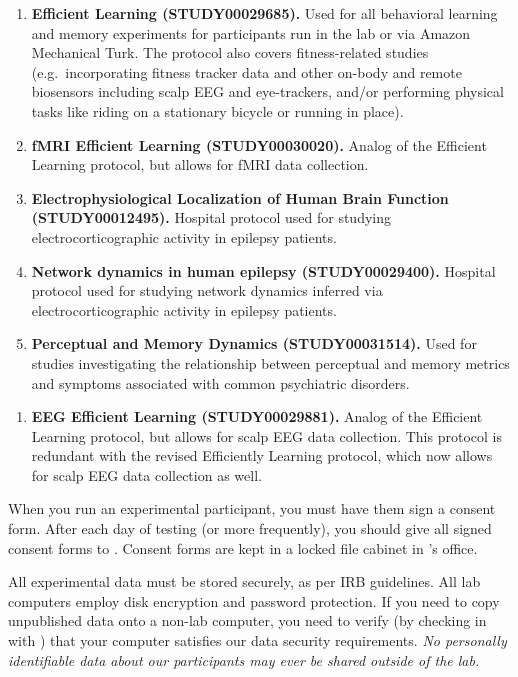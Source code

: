 \documentclass{tufte-book} %
\begin{document}

 \begin{enumerate}
 \item \textbf{Efficient Learning (STUDY00029685).}  Used for all
   behavioral learning and memory experiments for participants run in
   the lab or via Amazon Mechanical Turk.  The protocol also covers
   fitness-related studies (e.g.\ incorporating fitness tracker data
   and other on-body and remote biosensors including scalp EEG and
   eye-trackers, and/or performing physical tasks like riding on a
   stationary bicycle or running in place).
    \item \textbf{fMRI Efficient Learning (STUDY00030020).}  Analog of
      the Efficient Learning protocol, but allows for fMRI data
      collection.
    \item \textbf{Electrophysiological Localization of Human Brain
        Function (STUDY00012495).}  Hospital protocol used for
      studying electrocorticographic activity in epilepsy patients.
    \item \textbf{Network dynamics in human epilepsy (STUDY00029400).}
      Hospital protocol used for studying network dynamics inferred
      via electrocorticographic activity in epilepsy patients.
    \item \textbf{Perceptual and Memory Dynamics (STUDY00031514).}
    Used for studies investigating the relationship between perceptual and
    memory metrics and symptoms associated with common psychiatric disorders.

   \end{enumerate}

 \begin{enumerate}
   \item \textbf{EEG Efficient Learning (STUDY00029881).} Analog of
     the Efficient Learning protocol, but allows for scalp EEG data
     collection.  This protocol is redundant with the revised
     Efficiently Learning protocol, which now allows for scalp EEG
     data collection as well.
   \end{enumerate}

   When you run an experimental participant, you must have them sign a
   consent form.  After each day of testing (or more frequently), you
   should give all signed consent forms to \coordinator.  Consent
   forms are kept in a locked file cabinet in \director 's office.

   All experimental data must be stored securely, as per IRB
   guidelines.  All lab computers employ disk encryption and password
   protection.  If you need to copy unpublished data onto a non-lab
   computer, you need to verify (by checking in with \director) that
   your computer satisfies our data security requirements.  \textit{No
   personally identifiable data about our participants may ever be
   shared outside of the lab.}
\end{document}
